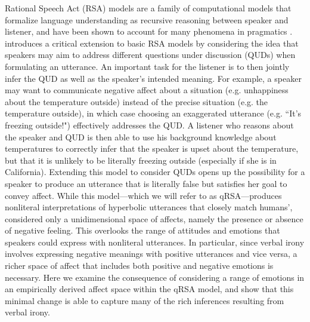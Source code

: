 \documentclass[10pt,letterpaper]{article}
\begin{document}
Rational Speech Act (RSA) models are a family of computational models that formalize language understanding as recursive reasoning between speaker and listener, and have been shown to account for many phenomena in pragmatics \cite{frank2012predicting, goodman2013knowledge}.  introduces a critical extension to basic RSA models by considering the idea that speakers may aim to address different questions under discussion (QUDs) when formulating an utterance. An important task for the listener is to then jointly infer the QUD as well as the speaker's intended meaning. For example, a speaker may want to communicate negative affect about a situation (e.g. unhappiness about the temperature outside) instead of the precise situation (e.g. the temperature outside), in which case choosing an exaggerated utterance (e.g. ``It's freezing outside!") effectively addresses the QUD. A listener who reasons about the speaker and QUD is then able to use his background knowledge about temperatures to correctly infer that the speaker is upset about the temperature, but that it is unlikely to be literally freezing outside (especially if she is in California). Extending this model to consider QUDs opens up the possibility for a speaker to produce an utterance that is literally false but satisfies her goal to convey affect. While this model---which we will refer to as qRSA---produces nonliteral interpretations of hyperbolic utterances that closely match humans',  considered only a unidimensional space of affects, namely the presence or absence of negative feeling. This overlooks the range of attitudes and emotions that speakers could express with nonliteral utterances. In particular, since verbal irony involves expressing negative meanings with positive utterances and vice versa, a richer space of affect that includes both positive and negative emotions is necessary. Here we examine the consequence of considering a range of emotions in an empirically derived affect space within the qRSA model, and show that this minimal change is able to capture many of the rich inferences resulting from verbal irony.



\end{document}
